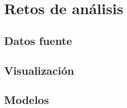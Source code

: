 \section{Retos de análisis}
\label{section:retos}

\Blindtext[2]

\subsection{Datos fuente}
\label{subsection:retos:datos}

\Blindtext[7]

\subsection{Visualización}
\label{subsection:retos:viz}

\Blindtext[1]

\subsection{Modelos}
\label{subsection:retos:modelos}

\Blindtext[1]


